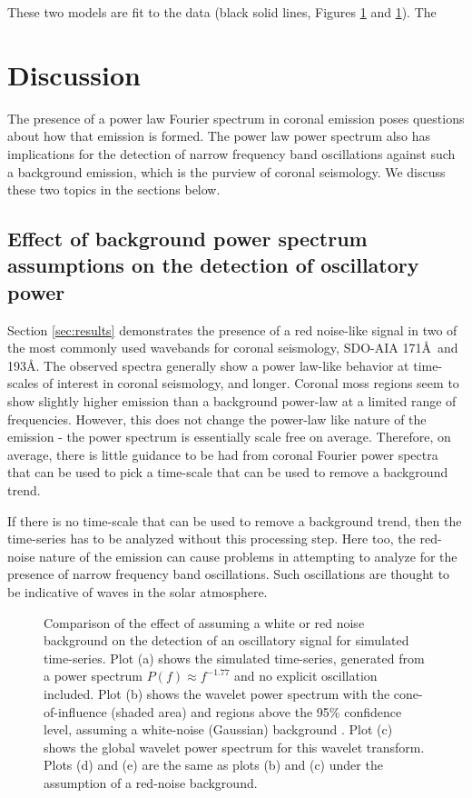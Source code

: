 \documentclass[manuscript]{../aastex52/aastex}
\begin{document}
These two models are fit to the data (black solid lines, Figures \ref{} and \ref{}). The


\section{Discussion}
The presence of a power law Fourier spectrum in coronal emission poses
questions about how that emission is formed.  The power law power
spectrum also has implications for the detection of narrow frequency
band oscillations against such a background emission, which is the
purview of coronal seismology.  We discuss these two topics in the
sections below.


\subsection{Effect of background power spectrum assumptions on the
  detection of oscillatory power}
\label{ssec:corseis}

Section \ref{sec:results} demonstrates the presence of a red
noise-like signal in two of the most commonly used wavebands for
coronal seismology, SDO-AIA 171\AA\ and 193\AA.  The observed spectra
generally show a power law-like behavior at time-scales of interest in
coronal seismology, and longer.  Coronal moss regions seem to show
slightly higher emission than a background power-law at a limited
range of frequencies.  However, this does not change the power-law
like nature of the emission - the power spectrum is essentially scale
free on average.  Therefore, on average, there is little guidance to
be had from coronal Fourier power spectra that can be used to pick a
time-scale that can be used to remove a background trend.

If there is no time-scale that can be used to remove a background
trend, then the time-series has to be analyzed without this processing
step.  Here too, the red-noise nature of the emission can cause
problems in attempting to analyze for the presence of narrow frequency
band oscillations.  Such oscillations are thought to be indicative of
waves in the solar atmosphere.

\begin{figure}
\caption{Comparison of the effect of assuming a white or red noise
  background on the detection of an oscillatory signal for simulated
  time-series.  Plot (a) shows the simulated time-series, generated
  from a power spectrum \protect$P(f)\approx f^{-1.77}$ and no
  explicit oscillation included.  Plot (b) shows the wavelet power
  spectrum with the cone-of-influence (shaded area) and regions above
  the 95\% confidence level, assuming a white-noise (Gaussian)
 background .  Plot (c) shows the global wavelet power spectrum for
  this wavelet transform.  Plots (d) and (e) are the same as plots (b)
  and (c) under the assumption of a red-noise background.\label{fig:comparison}}
\end{figure}
\end{document}
